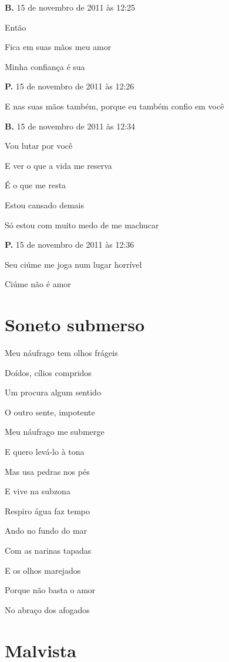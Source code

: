 {\textbf{B.} 15 de novembro de 2011 às 12:25

Então

Fica em suas mãos meu amor

Minha confiança é sua

\textbf{P.} 15 de novembro de 2011 às 12:26

E nas suas mãos também, porque eu também confio em você

\textbf{B.} 15 de novembro de 2011 às 12:34

Vou lutar por você

E ver o que a vida me reserva

É o que me resta

Estou cansado demais

Só estou com muito medo de me machucar

\textbf{P.} 15 de novembro de 2011 às 12:36

Seu ciúme me joga num lugar horrível

Ciúme não é amor
}

\chapter{Soneto submerso}


{\parindent0pt
Meu náufrago tem olhos frágeis

Doídos, cílios compridos

Um procura algum sentido

O outro sente, impotente\medskip

Meu náufrago me submerge

E quero levá-lo à tona

Mas usa pedras nos pés

E vive na subzona\medskip

Respiro água faz tempo

Ando no fundo do mar

Com as narinas tapadas\medskip

E os olhos marejados

Porque não basta o amor

No abraço dos afogados
}

\chapter{Malvista}

